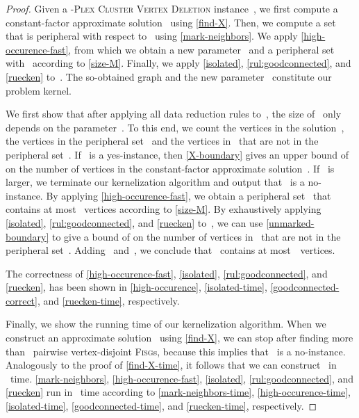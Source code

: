 \documentclass[12pt, a4paper, abstracton]{scrreprt}
\newcommand{\name}{\textsc}
\newcommand{\pvd}[1]{\name{\mbox{-Plex} Cluster Vertex Deletion}}
\newcommand{\FISG}{\textsc{Fisg}}
\theoremstyle{definition}
\theoremstyle{remark}
\begin{document}
\begin{proof}
  Given a \pvd 2 instance~, we first compute a constant-factor approximate solution~ using \autoref{find-X}. Then, we compute a set that is peripheral with respect to~ using \autoref{mark-neighbors}. We apply \autoref{high-occurence-fast}, from which we obtain a new parameter~ and a peripheral set~ with~ according to \autoref{size-M}. Finally, we apply \autoref{isolated}, \autoref{rul:goodconnected}, and \autoref{ruecken} to~. The so-obtained graph and the new parameter~ constitute our problem kernel.

  We first show that after applying all data reduction rules to~, the size of~ only depends on the parameter~. To this end, we count the vertices in the solution~, the vertices in the peripheral set~ and the vertices in~ that are not in the peripheral set~. If~ is a yes-instance, then \autoref{X-boundary} gives an upper bound of~ on the number of vertices in the constant-factor approximate solution~. If~ is larger, we terminate our kernelization algorithm and output that~ is a no-instance. By applying \autoref{high-occurence-fast}, we obtain a peripheral set~ that contains at most~ vertices according to \autoref{size-M}.  By exhaustively applying \autoref{isolated}, \autoref{rul:goodconnected}, and \autoref{ruecken} to~, we can use \autoref{unmarked-boundary} to give a bound of  on the number of vertices in~ that are not in the peripheral set~. Adding~ and~, we conclude that~ contains at most~~vertices.

The correctness of \autoref{high-occurence-fast}, \autoref{isolated}, \autoref{rul:goodconnected}, and \autoref{ruecken}, has been shown in \autoref{high-occurence}, \autoref{isolated-time}, \autoref{goodconnected-correct}, and \autoref{ruecken-time}, respectively.

Finally, we show the running time of our kernelization algorithm. When we construct an approximate solution~ using \autoref{find-X}, we can stop after finding more than~ pairwise vertex-disjoint \FISG{}s, because this implies that~ is a no-instance. Analog\-ously to the proof of \autoref{find-X-time}, it follows that we can construct~ in ~time. \autoref{mark-neighbors}, \autoref{high-occurence-fast}, \autoref{isolated}, \autoref{rul:goodconnected}, and \autoref{ruecken} run in~ time according to \autoref{mark-neighbors-time}, \autoref{high-occurence-time}, \autoref{isolated-time}, \autoref{goodconnected-time}, and \autoref{ruecken-time}, respectively.
\end{proof}
\end{document}
